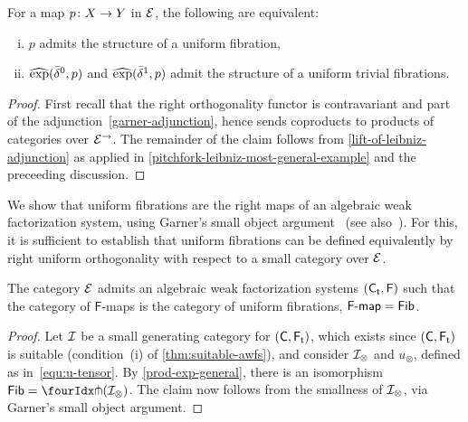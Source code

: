 \documentclass[reqno,10pt,a4paper,oneside,draft]{amsart}
\begin{document}
{{\begin{proposition} \label{prod-exp-general}
For a map $p \co X \to Y$ in $\catE$, the following are equivalent:
\begin{enumerate}[(i)]
\item $p$ admits the structure of a uniform fibration,
\item $\hatexp(\bar{\delta}^0, p)$ and $\hatexp(\bar{\delta}^1, p)$ admit the structure of a uniform trivial fibrations.
\end{enumerate}
\end{proposition}

\begin{proof}
First recall that the right orthogonality functor is contravariant and part of the adjunction~\eqref{garner-adjunction}, hence sends coproducts to products of categories over $\catE^\to$.
The remainder of the claim follows from \cref{lift-of-leibniz-adjunction} as applied in \cref{pitchfork-leibniz-most-general-example} and the preceeding discussion.
\end{proof}



We show that uniform fibrations are the right maps of an algebraic weak factorization system, using Garner's small object argument~\cite{garner:small-object-argument} (see also~\cite[Proposition~16]{bourke-garner-I}). For this, it is sufficient to establish
that uniform fibrations can be defined equivalently by right uniform orthogonality with respect to a small category over $\catE$.





\begin{theorem} \label{thm:sset-cset-nwfs} The category $\cal{E}$ admits an algebraic weak factorization systems $(\TC, \FF)$ such that  the category of $\mathsf{F}$-maps is the category of uniform fibrations, \ie $\palg{\mathsf{F}} = \Fib$.
\end{theorem}

\begin{proof} Let $\cal{I}$ be a small generating category for $(\CC, \TF)$, which exists since 
$(\CC, \TF)$ is suitable (condition~(i) of \cref{thm:suitable-awfs}), and consider $\cal{I}_\otimes$ and $u_\otimes$, defined as in~\eqref{equ:u-tensor}.
By \cref{prod-exp-general}, there is an isomorphism $\Fib  = \liftr{(\cal{I}_\otimes)}$. The claim now follows 
from the smallness of  $\cal{I}_\otimes$, via Garner's small object argument.
\end{proof}


}}
\end{document}
